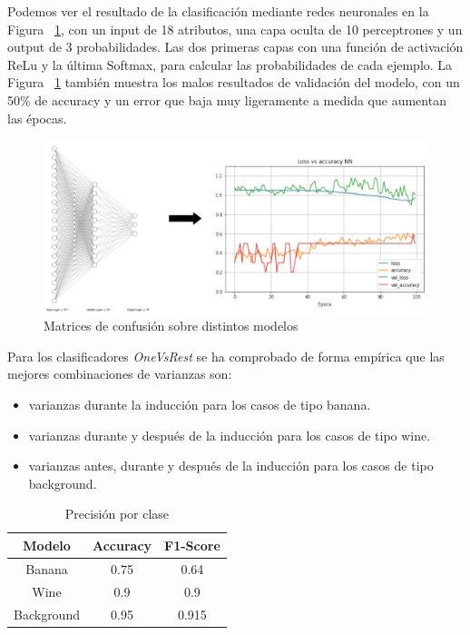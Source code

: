 \documentclass{esannV2}
\begin{document}
Podemos ver el resultado de la clasificación mediante redes neuronales en la Figura ~\ref{fig:nn}, con un input de 18 atributos, una capa oculta de 10 perceptrones y un output de 3 probabilidades. Las dos primeras capas con una función de activación ReLu y la última Softmax, para calcular las probabilidades de cada ejemplo. La Figura ~\ref{fig:nn} también muestra los malos resultados de validación del modelo, con un 50\% de accuracy y un error que baja muy ligeramente a medida que aumentan las épocas.   \\

\begin{figure}[b!]
\centering
\includegraphics[scale=0.3]{img/nn.png}
\caption{Matrices de confusión sobre distintos modelos}\label{fig:nn}
\end{figure}

Para los clasificadores \textit{OneVsRest} se ha comprobado de forma empírica que las mejores combinaciones de varianzas son:
\begin{itemize}
  \item varianzas durante la inducción para los casos de tipo banana.
  \item varianzas durante y después de la inducción para los casos de tipo wine.
  \item varianzas antes, durante y después de la inducción para los casos de tipo background.
\end{itemize}


\begin{table}[!]
  \centering
  \begin{tabular}{|c|c|c|}
    \hline
    Modelo & Accuracy & F1-Score \\
    \hline
    Banana & 0.75 & 0.64 \\ 
	Wine & 0.9 & 0.9 \\ 
	Background & 0.95 & 0.915 \\ 
    \hline
  \end{tabular}
  \caption{Precisión por clase}\label{tab:lazypred}
\end{table}
\end{document}
